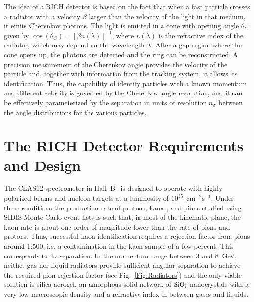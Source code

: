 \documentclass[5p,times,twocolumn]{elsarticle}
\begin{document}
The idea of a RICH detector is based on the fact that when a fast particle crosses a radiator with a velocity $\beta$
larger than the velocity of the light in that medium, it emits Cherenkov photons. The light is emitted in a cone with
opening angle $\theta_C$ given by $\cos(\theta_C)=[\beta n(\lambda)]^{-1}$, where $n(\lambda)$ is the refractive index
of the radiator, which may depend on the wavelength $\lambda$. After a gap region where the cone opens up, the
photons are detected and the ring can be reconstructed. A precision measurement of the Cherenkov angle provides
the velocity of the particle and, together with information from the tracking system, it allows its identification. Thus,
the capability of identify particles with a known momentum and different velocity is governed by the Cherenkov angle
resolution, and it can be effectively parameterized by the separation in units of resolution $n_{\sigma}$ between the
angle distributions for the various particles.

\section{The RICH Detector Requirements and Design}

The CLAS12 spectrometer in Hall~B~\cite{REF:overview-nim} is designed to operate with highly polarized beams and
nucleon targets at a luminosity of $10^{35}$~cm$^{-2}$s$^{-1}$. Under these conditions the production rate of protons,
kaons, and pions studied using SIDIS Monte Carlo event-lists is such that, in most of the kinematic plane, the kaon rate
is about one order of magnitude lower than the rate of pions and protons. Thus, successful kaon identification requires
a rejection factor from pions around 1:500, i.e. a contamination in the kaon sample of a few percent. This corresponds to
4$\sigma$ separation. In the momentum range between 3 and 8~GeV, neither gas nor liquid radiators provide sufficient
angular separation to achieve the required pion rejection factor (see Fig.~\ref{Fig:Radiators}) and the only viable
solution is silica aerogel, an amorphous solid network of $\rm SiO_2$ nanocrystals with a very low macroscopic density
and a refractive index in between gases and liquids.
\end{document}
